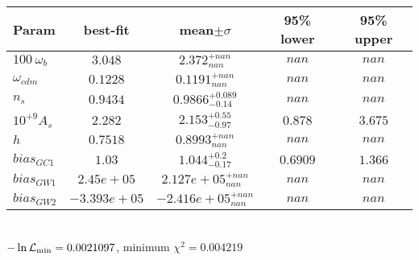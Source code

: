 \begin{tabular}{|l|c|c|c|c|} 
 \hline 
Param & best-fit & mean$\pm\sigma$ & 95\% lower & 95\% upper \\ \hline 
$100~\omega_{b }$ &$3.048$ & $2.372_{nan}^{+nan}$ & $nan$ & $nan$ \\ 
$\omega_{cdm }$ &$0.1228$ & $0.1191_{nan}^{+nan}$ & $nan$ & $nan$ \\ 
$n_{s }$ &$0.9434$ & $0.9866_{-0.14}^{+0.089}$ & $nan$ & $nan$ \\ 
$10^{+9}A_{s }$ &$2.282$ & $2.153_{-0.97}^{+0.55}$ & $0.878$ & $3.675$ \\ 
$h$ &$0.7518$ & $0.8993_{nan}^{+nan}$ & $nan$ & $nan$ \\ 
$bias_{GC 1 }$ &$1.03$ & $1.044_{-0.17}^{+0.2}$ & $0.6909$ & $1.366$ \\ 
$bias_{GW 1 }$ &$2.45e+05$ & $2.127e+05_{nan}^{+nan}$ & $nan$ & $nan$ \\ 
$bias_{GW 2 }$ &$-3.393e+05$ & $-2.416e+05_{nan}^{+nan}$ & $nan$ & $nan$ \\ 
\hline 
 \end{tabular} \\ 
$-\ln{\cal L}_\mathrm{min} =0.0021097$, minimum $\chi^2=0.004219$ \\ 
